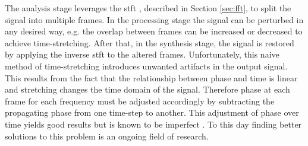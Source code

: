 The analysis stage leverages the \gls{stft} \cite{MOULINES1995175}, described in Section \ref{sec:fft}, to split the signal into multiple frames. In the processing stage the signal can be perturbed in any desired way, e.g. the overlap between frames can be increased or decreased to achieve time-stretching. After that, in the synthesis stage, the signal is restored by applying the inverse \gls{stft} to the altered frames. Unfortunately, this naive method of time-stretching introduces unwanted artifacts in the output signal. This results from the fact that the relationship between phase and time is linear \cite{MOULINES1995175} and stretching changes the time domain of the signal. Therefore phase at each frame for each frequency must be adjusted accordingly by subtracting the propagating phase from one time-step to another. This adjustment of phase over time yields good results but is known to be imperfect \cite{prusa2017phasevocoder}. To this day finding better solutions to this problem is an ongoing field of research.